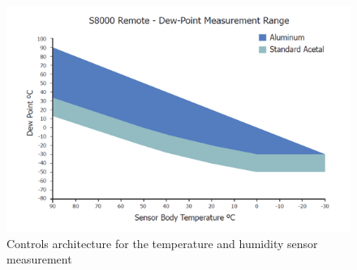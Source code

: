 \begin{figure}[!h]
\centering
\includegraphics[width=0.65\columnwidth]{Chapter5/images/s8000_remote.png}
\caption{Controls architecture for the temperature and humidity sensor measurement}
\label{fig:fos_mirror}
\end{figure}
